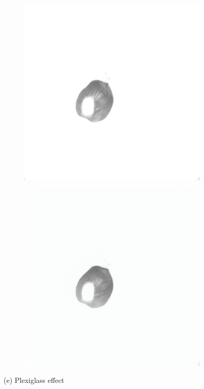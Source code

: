 \documentclass[12pt,DIV14,BCOR12mm,a4paper,footinclude=false,headinclude,parskip=half-,twoside,openright,cleardoublepage=empty,toc=index,bibliography=totoc,listof=totoc]{scrreprt}
\numberwithin{equation}{chapter}
\begin{document}
\begin{figure}
    \vspace{0.3cm} %

    \begin{subfigure}[t]{0.24\textwidth}
        \centering
        \includegraphics[width=\textwidth]{../media/diff_nuts_plexi_real.png}
    \end{subfigure}%
    \hspace{0.02\textwidth}
    \begin{subfigure}[t]{0.24\textwidth}
        \centering
        \includegraphics[width=\textwidth]{../media/diff_nuts_plexi_fake.png}
    \end{subfigure}
    \caption*{(e) Plexiglass effect}


\end{figure}
\end{document}
